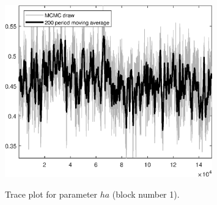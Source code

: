 \begin{figure}[H]
\centering
  \includegraphics[width=0.8\textwidth]{BRS_gen/graphs/TracePlot_ha_blck_1}\\
    \caption{Trace plot for parameter ${ha}$ (block number 1).}
\end{figure}
